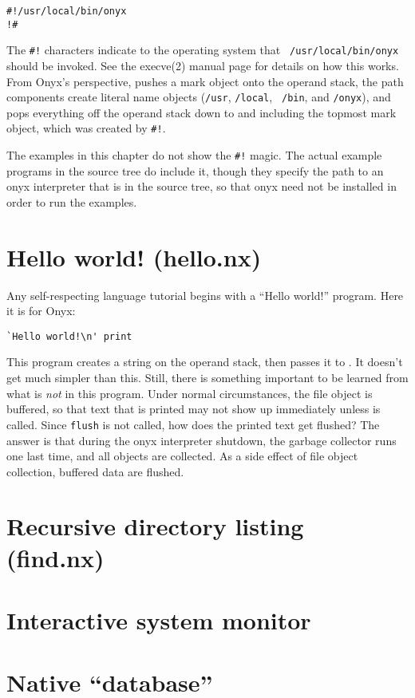 \begin{verbatim}
#!/usr/local/bin/onyx
!#
\end{verbatim}

The {\tt \#!} characters indicate to the operating system that {\tt
/usr/local/bin/onyx} should be invoked.  See the execve(2) manual page for
details on how this works.  From Onyx's perspective,  pushes a mark object onto the operand stack, the
path components create literal name objects ({\tt /usr}, {\tt /local}, {\tt
/bin}, and {\tt /onyx}), and  pops
everything off the operand stack down to and including the topmost mark object,
which was created by {\tt \#!}.

The examples in this chapter do not show the {\tt \#!} magic.  The actual
example programs in the source tree do include it, though they specify the path
to an onyx interpreter that is in the source tree, so that onyx need not be
installed in order to run the examples.

\section{Hello world! (hello.nx)}

Any self-respecting language tutorial begins with a ``Hello world!'' program.
Here it is for Onyx:

\begin{verbatim}
`Hello world!\n' print
\end{verbatim}

This program creates a string on the operand stack, then passes it to
.  It doesn't get much simpler than this.
Still, there is something important to be learned from what is {\em not} in this
program.  Under normal circumstances, the  file object is buffered, so that text that is
printed may not show up immediately unless  is called.  Since {\tt flush} is not called, how does
the printed text get flushed?  The answer is that during the onyx interpreter
shutdown, the garbage collector runs one last time, and all objects are
collected.  As a side effect of file object collection, buffered data are
flushed.

\section{Recursive directory listing (find.nx)}

\section{Interactive system monitor}

\section{Native ``database''}
